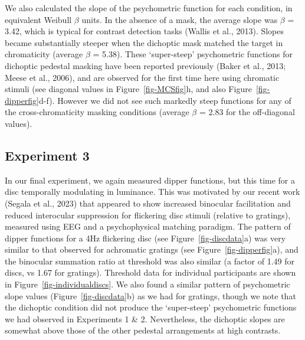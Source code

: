 \documentclass[
  letterpaper,
  DIV=11,
  numbers=noendperiod]{scrartcl}
\begin{document}
We also calculated the slope of the psychometric function for each
condition, in equivalent Weibull \(\beta\) units. In the absence of a
mask, the average slope was \(\beta\) = 3.42, which is typical for
contrast detection tasks (Wallis et al., 2013). Slopes became
substantially steeper when the dichoptic mask matched the target in
chromaticity (average \(\beta\) = 5.38). These `super-steep'
psychometric functions for dichoptic pedestal masking have been reported
previously (Baker et al., 2013; Meese et al., 2006), and are observed
for the first time here using chromatic stimuli (see diagonal values in
Figure~\ref{fig-MCSfig}h, and also Figure~\ref{fig-dipperfig}d-f).
However we did not see such markedly steep functions for any of the
cross-chromaticity masking conditions (average \(\beta\) = 2.83 for the
off-diagonal values).

\hypertarget{experiment-3}{%
\subsection{Experiment 3}\label{experiment-3}}

In our final experiment, we again measured dipper functions, but this
time for a disc temporally modulating in luminance. This was motivated
by our recent work (Segala et al., 2023) that appeared to show increased
binocular facilitation and reduced interocular suppression for
flickering disc stimuli (relative to gratings), measured using EEG and a
psychophysical matching paradigm. The pattern of dipper functions for a
4Hz flickering disc (see Figure~\ref{fig-discdata}a) was very similar to
that observed for achromatic gratings (see Figure~\ref{fig-dipperfig}a),
and the binocular summation ratio at threshold was also similar (a
factor of 1.49 for discs, vs 1.67 for gratings). Threshold data for
individual participants are shown in Figure~\ref{fig-individualdiscs}.
We also found a similar pattern of psychometric slope values
(Figure~\ref{fig-discdata}b) as we had for gratings, though we note that
the dichoptic condition did not produce the `super-steep' psychometric
functions we had observed in Experiments 1 \& 2. Nevertheless, the
dichoptic slopes are somewhat above those of the other pedestal
arrangements at high contrasts.
\end{document}
